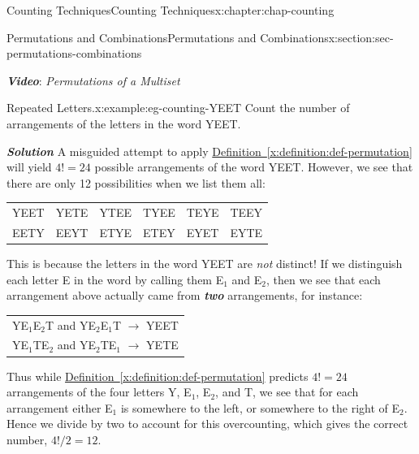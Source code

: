 \documentclass[oneside,10pt,]{book}
\newcommand{\tabularfont}{\relax}
\newcommand{\xreffont}{\relax}
\newcommand{\alert}[1]{\textbf{\textit{#1}}}
\numberwithin{equation}{section}
\begin{document}
\begin{chapterptx}{Counting Techniques}{}{Counting Techniques}{}{}{x:chapter:chap-counting}
\begin{sectionptx}{Permutations and Combinations}{}{Permutations and Combinations}{}{}{x:section:sec-permutations-combinations}
\begin{sidebyside}{1}{0}{0}{0}
\begin{sbspanel}{1}
\end{sbspanel}%
\end{sidebyside}%
\par
\alert{Video}: \emph{Permutations of a Multiset}%
\begin{example}{Repeated Letters.}{x:example:eg-counting-YEET}%
Count the number of arrangements of the letters in the word YEET.%
\par
\alert{Solution} A misguided attempt to apply \hyperref[x:definition:def-permutation]{Definition~{\xreffont\ref{x:definition:def-permutation}}} will yield \(4! = 24\) possible arrangements of the word YEET. However, we see that there are only 12 possibilities when we list them all:%
\begin{sidebyside}{1}{0.2}{0.2}{0}%
\begin{sbspanel}{0.6}%
{\centering%
{\tabularfont%
\begin{tabular}{llllll}
YEET&YETE&YTEE&TYEE&TEYE&TEEY\tabularnewline[0pt]
EETY&EEYT&ETYE&ETEY&EYET&EYTE
\end{tabular}
}%
\par}
\end{sbspanel}%
\end{sidebyside}%
\par
This is because the letters in the word YEET are \emph{not} distinct! If we distinguish each letter E in the word by calling them E\(_1\) and E\(_2\), then we see that each arrangement above actually came from \alert{two} arrangements, for instance:%
\begin{sidebyside}{1}{0.15}{0.15}{0}%
\begin{sbspanel}{0.7}%
{\centering%
{\tabularfont%
\begin{tabular}{l}
YE\(_1\)E\(_2\)T and YE\(_2\)E\(_1\)T \(\rightarrow\) YEET\tabularnewline[0pt]
YE\(_1\)TE\(_2\) and YE\(_2\)TE\(_1\) \(\rightarrow\) YETE
\end{tabular}
}%
\par}
\end{sbspanel}%
\end{sidebyside}%
\par
Thus while \hyperref[x:definition:def-permutation]{Definition~{\xreffont\ref{x:definition:def-permutation}}} predicts \(4! = 24\) arrangements of the four letters Y, E\(_1\), E\(_2\), and T, we see that for each arrangement either E\(_1\) is somewhere to the left, or somewhere to the right of E\(_2\). Hence we divide by two to account for this overcounting, which gives the correct number, \(4!/2 = 12\).%
\end{example}

\end{sectionptx}
\end{chapterptx}
\end{document}
